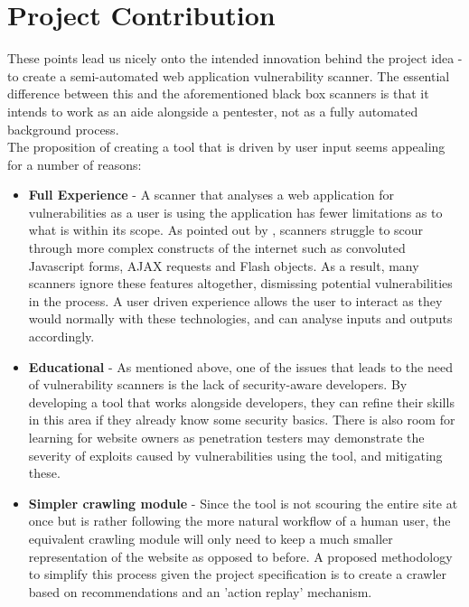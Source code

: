 \section{Project Contribution}
\label{contribution}

These points lead us nicely onto the intended innovation behind the project idea - to create a semi-automated web application vulnerability scanner. The essential difference between this and the aforementioned black box scanners is that it intends to work as an aide alongside a pentester, not as a fully automated background process. \\

The proposition of creating a tool that is driven by user input seems appealing for a number of reasons:

\begin{itemize}
	\item \textbf{Full Experience} - A scanner that analyses a web application for vulnerabilities as a user is using the application has fewer limitations as to what is within its scope. As pointed out by \cite{whyJohnnyCantPentest}, scanners struggle to scour through more complex constructs of the internet such as convoluted Javascript forms, AJAX requests and Flash objects. As a result, many scanners ignore these features altogether, dismissing potential vulnerabilities in the process. A user driven experience allows the user to interact as they would normally with these technologies, and can analyse inputs and outputs accordingly.
	
	\item \textbf{Educational} - As mentioned above, one of the issues that leads to the need of vulnerability scanners is the lack of security-aware developers. By developing a tool that works alongside developers, they can refine their skills in this area if they already know some security basics. There is also room for learning for website owners as penetration testers may demonstrate the severity of exploits caused by vulnerabilities using the tool, and mitigating these. 
	
	\item \textbf{Simpler crawling module} - Since the tool is not scouring the entire site at once but is rather following the more natural workflow of a human user, the equivalent crawling module will only need to keep a much smaller representation of the website as opposed to before. A proposed methodology to simplify this process given the project specification is to create a crawler based on recommendations and an 'action replay' mechanism. 
	

\end{itemize}
